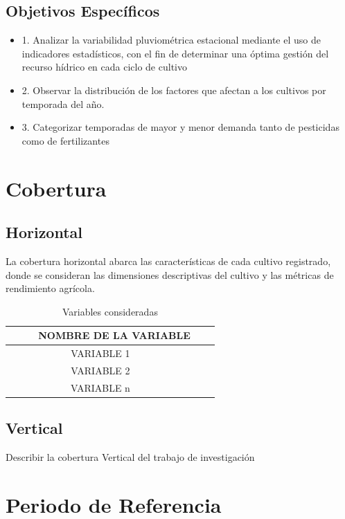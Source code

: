 \documentclass[oneside,11pt]{Latex/Classes/PhDthesisPSnPDF}
\begin{document}
\subsection{Objetivos Específicos}
\begin{itemize}
  \item{1.  Analizar la variabilidad pluviométrica estacional mediante el uso de indicadores estadísticos, con el fin de determinar una óptima gestión del recurso hídrico en cada ciclo de cultivo}
  \item{2.  Observar la distribución de los factores que afectan a los cultivos por temporada del año.}
  \item{3.  Categorizar temporadas de mayor y menor demanda tanto de pesticidas como de fertilizantes}
\end{itemize}

\section{Cobertura}

\subsection{Horizontal}

La cobertura horizontal abarca las características de cada cultivo
registrado, donde se consideran las dimensiones descriptivas del cultivo
y las métricas de rendimiento agrícola.\\

\begin{table}[ht]
\centering
\caption{Variables consideradas} 
\resizebox{10cm}{!} {
\begin{tabular}{ccc}
  \hline
\ \ \ \ \ NOMBRE DE LA VARIABLE \\ 
  \hline
   VARIABLE 1 \\ 
VARIABLE 2\\ 
VARIABLE n\\ 
   \hline
\end{tabular}
}
\end{table}

\subsection{Vertical}

Describir la cobertura Vertical del trabajo de investigación

\section{Periodo de Referencia}
\end{document}
